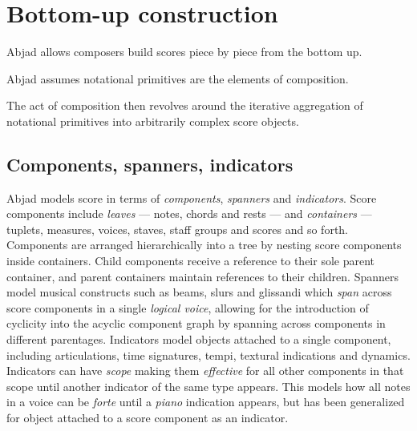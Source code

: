 \documentclass{article}
\begin{document}

\section{Bottom-up construction}

Abjad allows composers build scores piece by piece from the bottom up.

Abjad assumes notational primitives are the elements of composition.

The act of composition then revolves around the iterative aggregation of
notational primitives into arbitrarily complex score objects.

\subsection{Components, spanners, indicators}

Abjad models score in terms of \emph{components}, \emph{spanners} and
\emph{indicators}. Score components include \emph{leaves} --- notes, chords and
rests --- and \emph{containers} --- tuplets, measures, voices, staves, staff
groups and scores and so forth. Components are arranged hierarchically into a
tree by nesting score components inside containers. Child components receive a
reference to their sole parent container, and parent containers maintain
references to their children. Spanners model musical constructs such as beams,
slurs and glissandi which \emph{span} across score components in a single
\emph{logical voice}, allowing for the introduction of cyclicity into the
acyclic component graph by spanning across components in different parentages.
Indicators model objects attached to a single component, including
articulations, time signatures, tempi, textural indications and dynamics.
Indicators can have \emph{scope} making them \emph{effective} for all other
components in that scope until another indicator of the same type appears. This
models how all notes in a voice can be \emph{forte} until a \emph{piano}
indication appears, but has been generalized for object attached to a score
component as an indicator.
\end{document}
